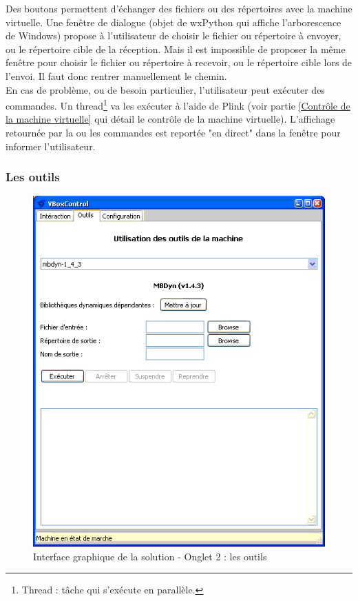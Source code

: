 Des boutons permettent d'échanger des fichiers ou des répertoires avec la machine virtuelle.
Une fenêtre de dialogue (objet de wxPython qui affiche l'arborescence de Windows) propose à l'utilisateur de choisir le fichier ou répertoire à envoyer, ou le répertoire cible de la réception.
Mais il est impossible de proposer la même fenêtre pour choisir le fichier ou répertoire à recevoir, ou le répertoire cible lors de l'envoi.
Il faut donc rentrer manuellement le chemin.
\\


En cas de problème, ou de besoin particulier, l'utilisateur peut exécuter des commandes.
Un thread\footnote{Thread : tâche qui s'exécute en parallèle.} va les exécuter à l'aide de Plink (voir partie \ref{Contrôle de la machine virtuelle} qui détail le contrôle de la machine virtuelle).
L'affichage retournée par la ou les commandes est reportée "en direct" dans la fenêtre pour informer l'utilisateur. 
\\




\subsubsection{Les outils}

\begin{figure}[!h]
	\center
	\includegraphics[scale=0.6]{img/Interface_solution_2.png}
	\caption{Interface graphique de la solution - Onglet 2 : les outils}
	\label{Interface graphique de la solution - Onglet 2 : les outils}
\end{figure}



